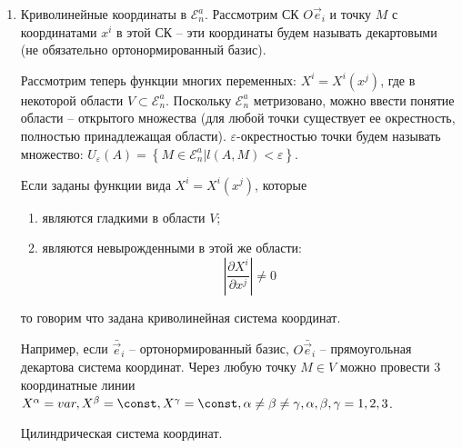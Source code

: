 \begin{enumerate}
  \item Криволинейные координаты в $\mathcal{E}_n^a$. Рассмотрим СК $O\vec{e}_i$ и точку $M$ с
    координатами $x^i$ в этой СК -- эти координаты будем называть декартовыми (не обязательно
    ортонормированный базис).
    
    \begin{figure}[H]
    	\centering
    	
    \end{figure}
    
    Рассмотрим теперь функции многих переменных: $X^i = X^i (x^j)$, где в некоторой области
    $V \subset \mathcal{E}_n^a$. Поскольку $\mathcal{E}_n^a$ метризовано, можно ввести понятие 
    области -- открытого множества (для любой точки существует ее окрестность, полностью
    принадлежащая области). $\varepsilon$-окрестностью точки будем называть множество:
    $U_\varepsilon(A) = \left\{ M \in \mathcal{E}_n^a | l(A, M) < \varepsilon \right\} $.
    
    \begin{figure}[H]
    	\centering
    	
    \end{figure}
    
    Если заданы функции вида $X^i = X^i (x^j)$, которые
    \begin{enumerate}
      \item являются гладкими в области $V$;
      \item являются невырожденными в этой же области:
        \[
          \left| \dfrac{\partial X^i}{\partial x^j} \right| \neq 0
        \]
    \end{enumerate}
    то говорим что задана криволинейная система координат.
  
    Например, если $\bar{\vec{e}}_i$ -- ортонормированный базис, $O\bar{\vec{e}}_i$ -- прямоугольная
    декартова система координат. Через любую точку $M \in V$ можно провести 3 координатные линии
    $X^\alpha = var, X^{\beta} = \const, X^\gamma = \const, \alpha \neq \beta \neq \gamma, \alpha, \beta, \gamma = 1, 2, 3$.
    
    \begin{figure}[H]
    	\centering
    	
    \end{figure}

	\begin{example}
		Цилиндрическая система координат. 
		
		\begin{figure}[H]
			\centering
			
		\end{figure}
		

\end{example}
\end{enumerate}
